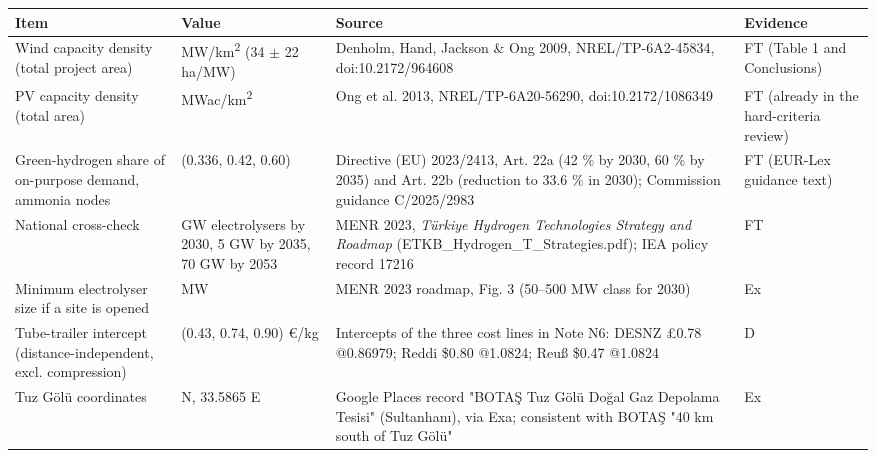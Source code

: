 \documentclass[11pt,a4paper]{article}
\begin{document}
\begin{center}\footnotesize
\begin{tabularx}{\textwidth}{>{\hsize=0.859\hsize\raggedright\arraybackslash}X>{\hsize=0.738\hsize\raggedright\arraybackslash}X>{\hsize=1.866\hsize\raggedright\arraybackslash}X>{\hsize=0.537\hsize\raggedright\arraybackslash}X}
\toprule
\textbf{Item} & \textbf{Value} & \textbf{Source} & \textbf{Evidence} \\
\midrule
Wind capacity density (total project area) & 3.0 MW/\allowbreak{}km\textsuperscript{2} (34 $\pm$ 22 ha/\allowbreak{}MW) & Denholm, Hand, Jackson \& Ong 2009, NREL/\allowbreak{}TP-6A2-45834, doi:10.2172/\allowbreak{}964608 & FT (Table 1 and Conclusions) \\
PV capacity density (total area) & 31 MWac/\allowbreak{}km\textsuperscript{2} & Ong et al. 2013, NREL/\allowbreak{}TP-6A20-56290, doi:10.2172/\allowbreak{}1086349 & FT (already in the hard-criteria review) \\
Green-hydrogen share of on-purpose demand, ammonia nodes & (0.336, 0.42, 0.60) & Directive (EU) 2023/\allowbreak{}2413, Art. 22a (42 \% by 2030, 60 \% by 2035) and Art. 22b (reduction to 33.6 \% in 2030); Commission guidance C/\allowbreak{}2025/\allowbreak{}2983 & FT (EUR-Lex guidance text) \\
National cross-check & 2 GW electrolysers by 2030, 5 GW by 2035, 70 GW by 2053 & MENR 2023, \textit{Türkiye Hydrogen Technologies Strategy and Roadmap} (ETKB\_\allowbreak{}Hydrogen\_\allowbreak{}T\_\allowbreak{}Strategies.pdf); IEA policy record 17216 & FT \\
Minimum electrolyser size if a site is opened & 50 MW & MENR 2023 roadmap, Fig. 3 (50--500 MW class for 2030) & Ex \\
Tube-trailer intercept (distance-independent, excl. compression) & (0.43, 0.74, 0.90) \euro{}/\allowbreak{}kg & Intercepts of the three cost lines in Note N6: DESNZ \pounds{}0.78 @0.86979; Reddi \$0.80 @1.0824; Reuß \$0.47 @1.0824 & D \\
Tuz Gölü coordinates & 38.0966 N, 33.5865 E & Google Places record "BOTAŞ Tuz Gölü Doğal Gaz Depolama Tesisi" (Sultanhanı), via Exa; consistent with BOTAŞ "40 km south of Tuz Gölü" & Ex \\
\bottomrule
\end{tabularx}
\end{center}
\end{document}
